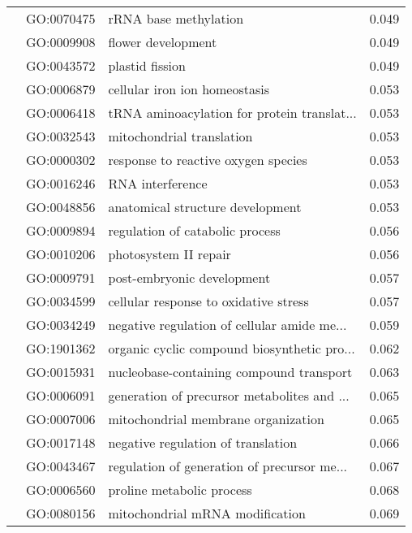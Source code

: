 \begin{longtable}{lllr}
   & GO:0070475 &                        rRNA base methylation &         0.049 \\
   & GO:0009908 &                           flower development &         0.049 \\
   & GO:0043572 &                              plastid fission &         0.049 \\
   & GO:0006879 &                cellular iron ion homeostasis &         0.053 \\
   & GO:0006418 &  tRNA aminoacylation for protein translat... &         0.053 \\
   & GO:0032543 &                    mitochondrial translation &         0.053 \\
   & GO:0000302 &          response to reactive oxygen species &         0.053 \\
   & GO:0016246 &                             RNA interference &         0.053 \\
   & GO:0048856 &             anatomical structure development &         0.053 \\
   & GO:0009894 &              regulation of catabolic process &         0.056 \\
   & GO:0010206 &                        photosystem II repair &         0.056 \\
   & GO:0009791 &                   post-embryonic development &         0.057 \\
   & GO:0034599 &        cellular response to oxidative stress &         0.057 \\
   & GO:0034249 &  negative regulation of cellular amide me... &         0.059 \\
   & GO:1901362 &  organic cyclic compound biosynthetic pro... &         0.062 \\
   & GO:0015931 &     nucleobase-containing compound transport &         0.063 \\
   & GO:0006091 &  generation of precursor metabolites and ... &         0.065 \\
   & GO:0007006 &          mitochondrial membrane organization &         0.065 \\
   & GO:0017148 &           negative regulation of translation &         0.066 \\
   & GO:0043467 &  regulation of generation of precursor me... &         0.067 \\
   & GO:0006560 &                    proline metabolic process &         0.068 \\
   & GO:0080156 &              mitochondrial mRNA modification &         0.069 \\

\end{longtable}
